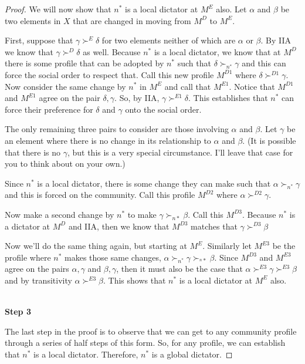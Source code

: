 \begin{proof}
We will now show that $n^*$ is a local dictator at $M^E$ also.  Let $\alpha$ and $\beta$ be two elements in $X$ that are changed in moving from $M^D$ to $M^E$. 

First, suppose that $\gamma \succ^E \delta$ for two elements neither of which are $\alpha$ or $\beta$.  By IIA we know that $\gamma \succ^D \delta$ as well. Because $n^*$ is a local dictator, we know that at $M^D$ there is some profile that can be adopted by $n^*$ such that $\delta \succ_{n^*} \gamma$ and this can force the social order to respect that.  Call this new profile $M^{D1}$ where $\delta \succ^{D1} \gamma$.  Now consider the same change by $n^*$ in $M^E$ and call that $M^{E1}$.  Notice that $M^{D1}$ and $M^{E1}$ agree on the pair $\delta, \gamma$.  So, by IIA, $\gamma \succ^{E1} \delta$. This establishes that $n^*$ can force their preference for $\delta$ and $\gamma$ onto the social order.

The only remaining three pairs to consider are those involving $\alpha$ and $\beta$.  Let $\gamma$ be an element where there is no change in its relationship to $\alpha$ and $\beta$. (It is possible that there is no $\gamma$, but this is a very special circumstance. I'll leave that case for you to think about on your own.)

Since $n^*$ is a local dictator, there is some change they can make such that $\alpha \succ_{n^*} \gamma$ and this is forced on the community.  Call this profile $M^{D2}$ where $\alpha \succ^{D2} \gamma$. 

Now make a second change by $n^*$ to make $\gamma \succ_{n*} \beta$.  Call this $M^{D3}$.  Because $n^*$ is a dictator at $M^D$ and IIA, then we know that $M^{D3}$ matches that $\gamma \succ^{D3} \beta$

Now we'll do the same thing again, but starting at $M^{E}$. Similarly let $M^{E3}$ be the profile where $n^*$ makes those same changes, $\alpha \succ_{n^*} \gamma \succ_{^n*} \beta$.  Since $M^{D3}$ and $M^{E3}$ agree on the pairs $\alpha, \gamma$ and $\beta, \gamma$, then it must also be the case that $\alpha \succ^{E3} \gamma \succ^{E3} \beta$ and by transitivity $\alpha \succ^{E3} \beta$. This shows that $n^*$ is a local dictator at $M^E$ also.

~\\
\noindent \textbf{Step 3}

The last step in the proof is to observe that we can get to any community profile through a series of half steps of this form.  So, for any profile, we can establish that $n^*$ is a local dictator.  Therefore, $n^*$ is a global dictator.

\end{proof}

